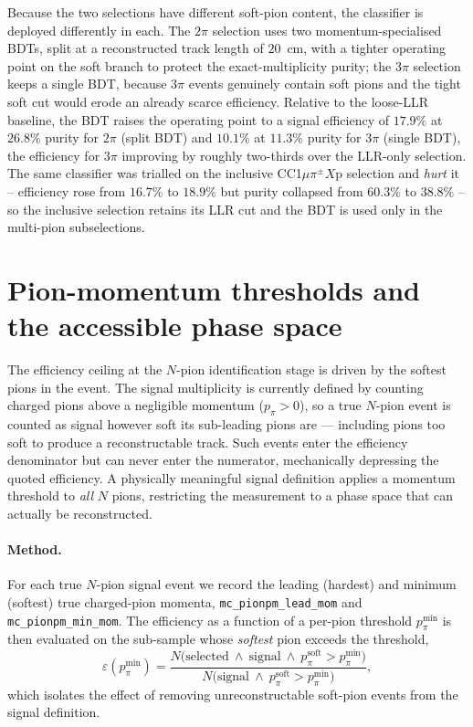 \documentclass[11pt,a4paper]{article}
\begin{document}
Because the two selections have different soft-pion content, the classifier is deployed
differently in each. The $2\pi$ selection uses two momentum-specialised BDTs, split at a
reconstructed track length of $20$~cm, with a tighter operating point on the soft branch
to protect the exact-multiplicity purity; the $3\pi$ selection keeps a single BDT, because
$3\pi$ events genuinely contain soft pions and the tight soft cut would erode an already
scarce efficiency. Relative to the loose-LLR baseline, the BDT raises the operating point
to a signal efficiency of $17.9\%$ at $26.8\%$ purity for $2\pi$ (split BDT) and $10.1\%$
at $11.3\%$ purity for $3\pi$ (single BDT), the efficiency for $3\pi$ improving by roughly
two-thirds over the LLR-only selection. The same classifier was trialled on the inclusive
CC1$\mu\pi^{\pm}X$p selection and \emph{hurt} it -- efficiency rose from $16.7\%$ to
$18.9\%$ but purity collapsed from $60.3\%$ to $38.8\%$ -- so the inclusive selection
retains its LLR cut and the BDT is used only in the multi-pion subselections.

\section{Pion-momentum thresholds and the accessible phase space}
\label{sec:thresholds}

The efficiency ceiling at the $N$-pion identification stage is driven by the softest
pions in the event. The signal multiplicity is currently defined by counting charged
pions above a negligible momentum ($p_\pi>0$), so a true $N$-pion event is counted as
signal however soft its sub-leading pions are --- including pions too soft to produce a
reconstructable track. Such events enter the efficiency denominator but can never enter
the numerator, mechanically depressing the quoted efficiency. A physically meaningful
signal definition applies a momentum threshold to \emph{all} $N$ pions, restricting the
measurement to a phase space that can actually be reconstructed.

\paragraph{Method.} For each true $N$-pion signal event we record the leading (hardest)
and minimum (softest) true charged-pion momenta, \texttt{mc\_pionpm\_lead\_mom} and
\texttt{mc\_pionpm\_min\_mom}. The efficiency as a function of a per-pion threshold
$p_{\pi}^{\min}$ is then evaluated on the sub-sample whose \emph{softest} pion exceeds
the threshold,
\[
  \varepsilon(p_\pi^{\min}) =
  \frac{N\big(\text{selected}\ \wedge\ \text{signal}\ \wedge\ p_\pi^{\text{soft}}>p_\pi^{\min}\big)}
       {N\big(\text{signal}\ \wedge\ p_\pi^{\text{soft}}>p_\pi^{\min}\big)},
\]
which isolates the effect of removing unreconstructable soft-pion events from the signal
definition.
\end{document}
